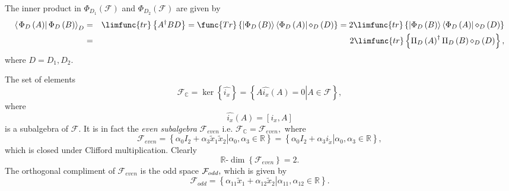 \documentclass[aps,preprint]{revtex4}
\begin{document}
The inner product in $\Phi _{D_{1}}\left( \mathcal{F}\right) $ and $\Phi
_{D_{2}}\left( \mathcal{F}\right) $ are given by 
\begin{eqnarray}
\left\langle \left. \Phi _{D}\left( A\right) \right\vert \Phi _{D}\left(
B\right) \right\rangle _{D} &=&\limfunc{tr}\left\{ A^{\dagger }BD\right\} =%
\func{Tr}\left\{ \left\vert \Phi _{D}\left( B\right) \right\rangle
\left\langle \Phi _{D}\left( A\right) \right\vert \mathcal{\Pi }_{D}\left(
D\right) \right\} =2\limfunc{tr}\left\{ \left\vert \Phi _{D}\left( B\right)
\right\rangle \left\langle \Phi _{D}\left( A\right) \right\vert \mathcal{\Pi 
}_{D}\left( D\right) \right\} \\
&=&2\limfunc{tr}\left\{ \Pi _{D}\left( A\right) ^{\dagger }\Pi _{D}\left(
B\right) \mathcal{\Pi }_{D}\left( D\right) \right\} ,
\end{eqnarray}%
where $D=D_{1},D_{2}.$

The set of elements 
\begin{equation}
\mathcal{F}_{\mathbb{C}}=\ker \left\{ \widehat{i_{x}}\right\} =\left\{
A\left. \widehat{i_{x}}\left( A\right) =0\right\vert A\in \mathcal{F}%
\right\} ,
\end{equation}%
where%
\begin{equation}
\widehat{i_{x}}\left( A\right) =\left[ i_{x},A\right]
\end{equation}%
is a subalgebra of $\mathcal{F}$. It is in fact the \emph{even subalgebra} $%
\mathcal{F}_{even}$ i.e. $\mathcal{F}_{\mathbb{C}}=\mathcal{F}_{even},$
where 
\begin{equation}
\mathcal{F}_{even}=\left\{ \left. \alpha _{0}I_{2}+\alpha _{3}\widetilde{x}%
_{1}\widetilde{x}_{2}\right\vert \alpha _{0},\alpha _{3}\in \mathbb{R}%
\right\} =\left\{ \left. \alpha _{0}I_{2}+\alpha _{3}i_{\widetilde{x}%
}\right\vert \alpha _{0},\alpha _{3}\in \mathbb{R}\right\} ,
\end{equation}%
which is closed under Clifford multiplication$.$ Clearly 
\begin{equation}
\mathbb{R}\text{-}\dim \left\{ \mathcal{F}_{even}\right\} =2.
\end{equation}%
The orthogonal compliment of $\mathcal{F}_{even}$ is the odd space $\mathcal{%
F}_{odd},$ which is given by 
\begin{equation}
\mathcal{F}_{odd}=\left\{ \left. \alpha _{11}\widetilde{x}_{1}+\alpha _{12}%
\widetilde{x}_{2}\right\vert \alpha _{11},\alpha _{12}\in \mathbb{R}\right\}
.
\end{equation}
\end{document}
